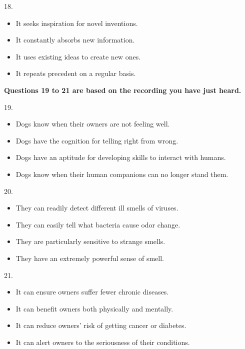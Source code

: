\documentclass[UTF8,11pt]{ctexart}
\begin{document}
18.


\begin{itemize}[leftmargin=2em,itemsep=.2em,topsep=.4em]\item[A.] It seeks inspiration for novel inventions.
\item[B.] It constantly absorbs new information.
\item[C.] It uses existing ideas to create new ones.
\item[D.] It repeats precedent on a regular basis.
\end{itemize}

\textbf{Questions 19 to 21 are based on the recording you have just heard.}


19.


\begin{itemize}[leftmargin=2em,itemsep=.2em,topsep=.4em]\item[A.] Dogs know when their owners are not feeling well.
\item[B.] Dogs have the cognition for telling right from wrong.
\item[C.] Dogs have an aptitude for developing skills to interact with humans.
\item[D.] Dogs know when their human companions can no longer stand them.
\end{itemize}

20.


\begin{itemize}[leftmargin=2em,itemsep=.2em,topsep=.4em]\item[A.] They can readily detect different ill smells of viruses.
\item[B.] They can easily tell what bacteria cause odor change.
\item[C.] They are particularly sensitive to strange smells.
\item[D.] They have an extremely powerful sense of smell.
\end{itemize}

21.


\begin{itemize}[leftmargin=2em,itemsep=.2em,topsep=.4em]\item[A.] It can ensure owners suffer fewer chronic diseases.
\item[B.] It can benefit owners both physically and mentally.
\item[C.] It can reduce owners’ risk of getting cancer or diabetes.
\item[D.] It can alert owners to the seriousness of their conditions.
\end{itemize}
\end{document}
